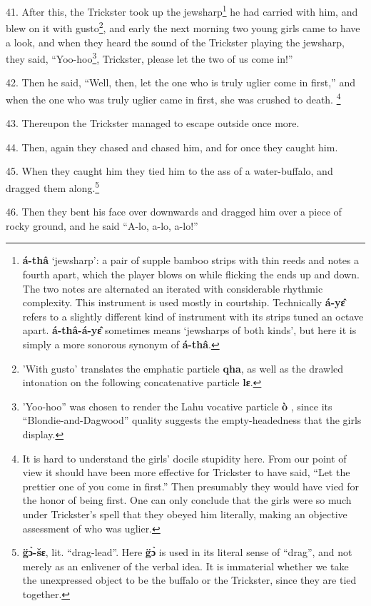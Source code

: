 41. After this, the Trickster took up the jewsharp\footnote{\textbf{á-thâ} `jewsharp': a pair of supple bamboo strips with thin reeds and notes a fourth apart, which the player blows on while flicking the ends up and down. The two notes are alternated an iterated with considerable rhythmic complexity. This instrument is used mostly in courtship. Technically \textbf{á-yɛ̂} refers to a slightly different kind of instrument with its strips tuned an octave apart. \textbf{á-thâ-á-yɛ̂} sometimes means `jewsharps of both kinds', but here it is simply a more sonorous synonym of \textbf{á-thâ}.} he had carried with him,
and blew on it with gusto\footnote{'With gusto' translates the emphatic particle \textbf{qha}, as well as the drawled intonation on the following concatenative particle \textbf{lɛ}.}, and early the next morning two young girls came
to have a look, and when they heard the sound of the Trickster playing the jewsharp,
they said, ``Yoo-hoo\footnote{'Yoo-hoo'' was chosen to render the Lahu vocative particle \textbf{ò} , since its ``Blondie-and-Dagwood'' quality suggests the empty-headedness that the girls display.}, Trickster, please let the two of us come in!''

42. Then he said, ``Well, then, let the one who is truly uglier come in first,''
and when the one who was truly uglier came in first, she was crushed to death.
\footnote{It is hard to understand the girls' docile stupidity here. From our point of view it should have been more effective for Trickster to have said, ``Let the prettier one of you come in first.'' Then presumably they would have vied for the honor of being first. One can only conclude that the girls were so much under Trickster's spell that they obeyed him literally, making an objective assessment of who was uglier.}

43. Thereupon the Trickster managed to escape outside once more.

44. Then, again they chased and chased him, and for once they caught him.

45. When they caught him they tied him to the ass of a water-buffalo, and dragged
them along.\footnote{\textbf{g̈ɔ̀-šɛ}, lit. ``drag-lead''. Here \textbf{g̈ɔ̀} is used in its literal sense of ``drag'', and not merely as an enlivener of the verbal idea. It is immaterial whether we take the unexpressed object to be the buffalo or the Trickster, since they are tied together.}

46. Then they bent his face over downwards and dragged him over a piece of rocky
ground, and he said ``A-lo, a-lo, a-lo!''


